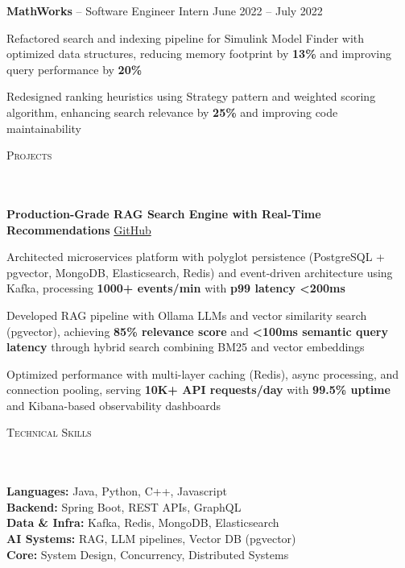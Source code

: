 \documentclass{article}
\newcommand{\header}[1]{{
\hspace*{-15pt}\vspace*{6pt} \textsc{#1}} \vspace*{-6pt} 
\lineunder
}
\newcommand{\lineunder}{
\vspace*{-8pt} \\ \hspace*{-18pt} 
\hrulefill \\
}
\newcommand{\employer}[4]{{
\vspace*{2pt}%
\textbf{#1} #2 \hfill #3\\ #4 \vspace*{2pt}}
}
\renewcommand{\labelitemii}{
$\vcenter{\hbox{\tiny$\bullet$}}$\hspace*{-3pt}
}
\newenvironment{bullet-list-minor}{
\begin{list}{\labelitemii}{\setlength\leftmargin{15pt} 
\topsep 0pt \itemsep -2pt}}{\vspace*{4pt}\end{list}
}
\begin{document}
\employer{MathWorks}{-- Software Engineer Intern}{June 2022 -- July 2022}{}
\begin{bullet-list-minor}

    \item Refactored search and indexing pipeline for Simulink Model Finder with optimized data structures, reducing memory footprint by \textbf{13\%} and improving query performance by \textbf{20\%}
    \item Redesigned ranking heuristics using Strategy pattern and weighted scoring algorithm, enhancing search relevance by \textbf{25\%} and improving code maintainability
\end{bullet-list-minor}
    
\vspace*{4pt}%
\header{Projects}

\textbf{Production-Grade RAG Search Engine with Real-Time Recommendations} \hfill
\href{https://github.com/vijeta99/AI-Powered-E-commerce-Analytics-Recommendation-Platform.git}{GitHub}

\begin{bullet-list-minor}
    \item Architected microservices platform with polyglot persistence (PostgreSQL + pgvector, MongoDB, Elasticsearch, Redis) and event-driven architecture using Kafka, processing \textbf{1000+ events/min} with \textbf{p99 latency <200ms}
    \item Developed RAG pipeline with Ollama LLMs and vector similarity search (pgvector), achieving \textbf{85\% relevance score} and \textbf{<100ms semantic query latency} through hybrid search combining BM25 and vector embeddings
    \item Optimized performance with multi-layer caching (Redis), async processing, and connection pooling, serving \textbf{10K+ API requests/day} with \textbf{99.5\% uptime} and Kibana-based observability dashboards
\end{bullet-list-minor}
\vspace*{4pt}%
\header{Technical Skills}

\textbf{Languages:} Java, Python, C++, Javascript \\[-2pt]
\textbf{Backend:} Spring Boot, REST APIs, GraphQL \\[-2pt]
\textbf{Data \& Infra:} Kafka, Redis, MongoDB, Elasticsearch \\[-2pt]
\textbf{AI Systems:} RAG, LLM pipelines, Vector DB (pgvector) \\[-2pt]
\textbf{Core:} System Design, Concurrency, Distributed Systems
\end{document}
